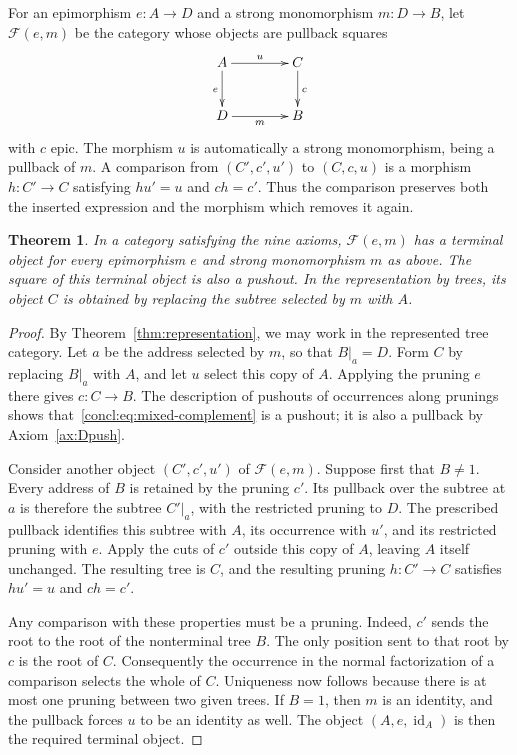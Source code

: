 \documentclass[11pt,a4paper]{article}
\theoremstyle{plain}
\newtheorem{theorem}{Theorem}[section]
\theoremstyle{definition}
\theoremstyle{remark}
\newcommand{\id}{\operatorname{id}}
\newcommand{\Fill}{\mathcal F}
\begin{document}
For an epimorphism $e:A\to D$ and a strong monomorphism
$m:D\to B$, let $\Fill(e,m)$ be the category whose objects are
pullback squares
\begin{equation}\label{concl:eq:mixed-complement}
\vcenter{\xymatrix@C=4em@R=2.5em{
A\ar[r]^u\ar[d]_e&C\ar[d]^c\\
D\ar[r]_m&B
}}
\end{equation}
with $c$ epic. The morphism $u$ is automatically a strong
monomorphism, being a pullback of $m$. A comparison from
$(C',c',u')$ to $(C,c,u)$ is a morphism $h:C'\to C$ satisfying
$hu'=u$ and $ch=c'$. Thus the comparison preserves both the
inserted expression and the morphism which removes it again.

\begin{theorem}\label{concl:thm:mixed-complements}
In a category satisfying the nine axioms, $\Fill(e,m)$ has a
terminal object for every epimorphism $e$ and strong monomorphism
$m$ as above. The square of this terminal object is also a
pushout. In the representation by trees, its object $C$ is
obtained by replacing the subtree selected by $m$ with $A$.
\end{theorem}
\begin{proof}
By Theorem~\ref{thm:representation}, we may work in the represented
tree category. Let $a$ be the address selected by $m$, so that
$B|_a=D$. Form $C$ by replacing $B|_a$ with $A$, and let $u$
select this copy of $A$. Applying the pruning $e$ there gives
$c:C\to B$. The description of pushouts of occurrences along
prunings shows that~\eqref{concl:eq:mixed-complement} is a pushout;
it is also a pullback by Axiom~\ref{ax:Dpush}.

Consider another object $(C',c',u')$ of $\Fill(e,m)$. Suppose
first that $B\ne1$. Every address of $B$ is retained by the
pruning $c'$. Its pullback over the subtree at $a$ is therefore
the subtree $C'|_a$, with the restricted pruning to $D$.
The prescribed pullback identifies this subtree with $A$, its
occurrence with $u'$, and its restricted pruning with $e$.
Apply the cuts of $c'$ outside this copy of $A$, leaving $A$
itself unchanged. The resulting tree is $C$, and the resulting
pruning $h:C'\to C$ satisfies $hu'=u$ and $ch=c'$.

Any comparison with these properties must be a pruning. Indeed,
$c'$ sends the root to the root of the nonterminal tree $B$.
The only position sent to that root by $c$ is the root of $C$.
Consequently the occurrence in the normal factorization of a
comparison selects the whole of $C$. Uniqueness now follows
because there is at most one pruning between two given trees.
If $B=1$, then $m$ is an identity, and the pullback forces
$u$ to be an identity as well. The object $(A,e,\id_A)$ is
then the required terminal object.
\end{proof}
\end{document}
